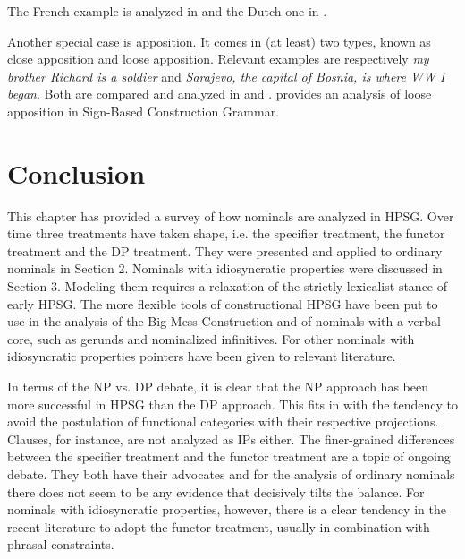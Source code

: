 \documentclass[output=paper]{langsci/langscibook}
\begin{document}
\noindent
The French example is analyzed in \citet[20--21]{Abeilleetal04} and the Dutch one in 
\citet[47--50]{VanEynde04}. 

Another special case is apposition. It comes in (at least) two types, known as 
close apposition and loose apposition. Relevant examples are respectively 
{\it my brother Richard is a soldier\/} and {\it Sarajevo, the capital of Bosnia, is where WW I began}.
Both are compared and analyzed in \citet{Kim12} and \citet{Kim14}. 
\citet{VanEyndeKim16} provides an analysis of loose apposition in
Sign-Based Construction Grammar. 



\section{Conclusion} 


This chapter has provided a survey of how nominals are analyzed in HPSG. 
Over time three treatments have taken shape, i.e. the specifier treatment, 
the functor treatment and the DP treatment. They were presented and applied to ordinary 
nominals in Section 2. Nominals with idiosyncratic properties were discussed in Section 3.
Modeling them requires a relaxation of the strictly lexicalist stance of early HPSG.  
The more flexible tools of constructional HPSG have been put to use in the analysis 
of the Big Mess Construction and of nominals with a verbal core, such as gerunds and 
nominalized infinitives. For other nominals with idiosyncratic properties pointers 
have been given to relevant literature. 

In terms of the NP vs. DP debate, it is clear that the NP approach has been 
more successful in HPSG than the DP approach. This fits in with the tendency to 
avoid the postulation of functional categories with their respective projections. 
Clauses, for instance, are not analyzed as IPs either. The finer-grained 
differences between the specifier treatment and the functor treatment are 
a topic of ongoing debate. They both have their advocates and for the analysis of 
ordinary nominals there does not seem to be any evidence that decisively tilts the balance. 
For nominals with idiosyncratic properties, however, there is a clear tendency in the recent 
literature to adopt the functor treatment, usually in combination with phrasal constraints.    


  
\end{document}

